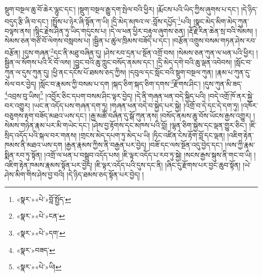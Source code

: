 སྡུག་བསྔལ་ཆུ་བོ་ཆེར་ལྷུང་དང་། །སྡུག་བསྔལ་རྒྱུ་དག་སྤེལ་བའི་ཕྱིར། །རྨོངས་པའི་ཡིད་ཀྱིས་ཞུགས་པ་དང་། །དེ་ཉིད་བདུད་རྩི་ཞི་བ་དང་། །སྤྲོས་པ་ཉེར་ཞི་སྟོན་ཀ་ཡི། །དྲི་མེད་མཁའ་ལ་:བློས་དཔྱོད་\footnote{«སྣར་»«པེ་»བློ་སྤྱོད་}པའི། །སྣང་མེད་མིག་མེད་ཀུན་བལྟས་ནས། །སྙིང་རྗེས་ཤིན་ཏུ་ཡིད་གདུངས་པ། །དེ་ལ་ཕན་ཕྱིར་བརྟུལ་ཞུགས་ཅན། །རྡོ་རྗེ་རིན་ཆེན་སྲ་བའི་སེམས། །སེམས་ཅན་གཙོ་བོ་ལེགས་བསླབས་པ། །སྦྱིན་པ་ཚུལ་ཁྲིམས་བཟོད་པ་དང་། །བརྩོན་འགྲུས་བསམ་གཏན་ཤེས་རབ་བརྩོན། །དུས་གཞན་\footnote{«སྣར་»«པེ་»ངན་}དང་ནི་མཐུ་བཞིན་དུ། །ཤེས་རབ་དྲན་པ་སྔོན་འགྲོ་བས། །སེམས་ཅན་ཀུན་ལ་ཕན་པའི་ཕྱིར། །སྦྱིན་ལ་སོགས་པའི་རི་བོ་ལས། །བྱུང་བའི་ཆུ་ཀླུང་བསོད་ནམས་དང་། །དྲི་མེད་དགེ་བའི་ཆུ་ལྡན་འབེབས། །སློང་བ་ཀུན་ལ་དུས་ཀུན་དུ། །ཕྱི་ནང་དངོས་པོ་ཐམས་ཅད་ཀྱིས། །དབུལ་དང་སློང་བའི་སྡུག་བསྔལ་ཀུན། །རྣམ་པ་ཀུན་དུ་སེལ་བར་བྱེད། །སློང་བ་རྣམས་ཀྱི་བསམ་པ་དག །སྐད་ཅིག་སྐད་ཅིག་དགས་\footnote{«སྣར་»«པེ་»དག་}རྫོགས་ཤིང་། །དུས་ཀུན་མི་ཟད་\footnote{«སྣར་»བཟད་}འབྲས་བུ་ཡིས།\footnote{«སྣར་»«པེ་»ཡི།} །འབྱོར་ཅིང་དཔག་བསམ་ཤིང་ལྟར་བྱེད། །དེ་ནི་གཞན་ཕན་བདེ་སྐྱིད་པའི། །བདེ་འགྲོ་ཁོ་ནར་སྐྱེ་བར་འགྱུར། །ཡང་ན་འདོད་པས་གཞན་དག་ཏུ། །གཞན་ཕན་བདེ་བ་སྐྱེད་པར་སྐྱེ། །འགྲོ་བ་དེ་དང་དེ་དག་ཏུ། །འཁོར་བཅུགས་རྟག་བཟོད་མཐའ་ཡས་དང་། །རྒྱ་མཚོ་བཞིན་དུ་སྒོ་ཀུན་ནས། །བསོད་ནམས་ཆུ་བོས་ཡོངས་རྒྱས་འགྱུར། །སེམས་གཉེན་རྣམ་པར་མི་གཡེང་དང་། །ཤེས་བྱ་རྟོགས་དང་མཁས་པའི་བློ། །ལྷན་ཅིག་སྐྱེས་དང་ལྡན་གྱུར་ཅིང་། །ཇི་སྲིད་འདོད་པའི་སྐལ་བར་གནས། །གྲངས་མེད་དཔག་ཏུ་མེད་པ་ཡི། །ཏིང་འཛིན་ངེས་རྟོག་བློ་དང་ལྡན། །འཇིག་རྟེན་ཁམས་ནི་མཐའ་ཡས་དག །རྒྱན་རྣམས་ཀྱིས་ནི་བརྒྱན་པར་བྱེད། །བཟོ་དང་ལས་སྔོན་འདུ་བྱེད་དང་། །ལས་ཀྱི་རྣམ་སྨིན་རབ་ཏུ་སྟོན། །འགྲོ་ལ་ཕན་པ་བསྒྲུབ་འདོད་པས། །ཇི་ལྟར་འདོད་པ་རབ་ཏུ་སྐྱེ། །སངས་རྒྱས་སྐུས་ནི་གང་བ་ཡི། །འཇིག་རྟེན་ཁམས་རྣམས་སྟོན་པར་བྱེད། །ཇི་ལྟར་འདོད་པའི་དུས་དང་ནི། །ཞིང་དུ་རྫོགས་པར་བྱང་ཆུབ་སྟོན། །ཡེ་ཤེས་མིག་གིས་ཤེས་བྱ་བའི། །དེ་ཉིད་ཐམས་ཅད་སྟོན་པར་བྱེད། །
